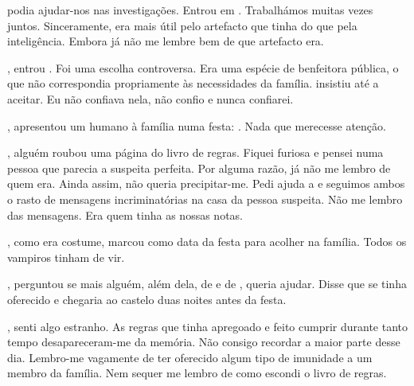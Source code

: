{ podia ajudar-nos nas investigações. Entrou em . Trabalhámos muitas vezes juntos. Sinceramente, era mais útil pelo artefacto que tinha do que pela inteligência. Embora já não me lembre bem de que artefacto era.

, entrou . Foi uma escolha controversa. Era uma espécie de benfeitora pública, o que não correspondia propriamente às necessidades da família.  insistiu até  a aceitar. Eu não confiava nela, não confio e nunca confiarei.

,  apresentou um humano à família numa festa: . Nada que merecesse atenção.

, alguém roubou uma página do livro de regras. Fiquei furiosa e pensei numa pessoa que parecia a suspeita perfeita. Por alguma razão, já não me lembro de quem era. Ainda assim, não queria precipitar-me. Pedi ajuda a  e seguimos ambos o rasto de mensagens incriminatórias na casa da pessoa suspeita. Não me lembro das mensagens. Era  quem tinha as nossas notas.

, como era costume,  marcou  como data da festa para acolher  na família. Todos os vampiros tinham de vir.

,  perguntou se mais alguém, além dela, de  e de , queria ajudar. Disse que  se tinha oferecido e chegaria ao castelo duas noites antes da festa.

, senti algo estranho. As regras que tinha apregoado e feito cumprir durante tanto tempo desapareceram-me da memória. Não consigo recordar a maior parte desse dia. Lembro-me vagamente de ter oferecido algum tipo de imunidade a um membro da família. Nem sequer me lembro de como escondi o livro de regras.

}
